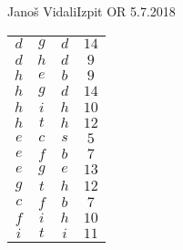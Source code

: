 \begin{naloga}{Janoš Vidali}{Izpit OR 5.7.2018}
\begin{odgovor}
\begin{tabela}
\begin{tabular}{cc|cc}
$ d$ & $g$ & $d$ & $14$ \\
$ d$ & $h$ & $d$ & $9$ \\
$ h$ & $e$ & $b$ & $9$ \\
$ h$ & $g$ & $d$ & $14$ \\
$ h$ & $i$ & $h$ & $10$ \\
$ h$ & $t$ & $h$ & $12$ \\
$ e$ & $c$ & $s$ & $5$ \\
$ e$ & $f$ & $b$ & $7$ \\
$ e$ & $g$ & $e$ & $13$ \\
$ g$ & $t$ & $h$ & $12$ \\
$ c$ & $f$ & $b$ & $7$ \\
$ f$ & $i$ & $h$ & $10$ \\
$ i$ & $t$ & $i$ & $11$ \\
\end{tabular}
\end{tabela}
\end{odgovor}
\end{naloga}
